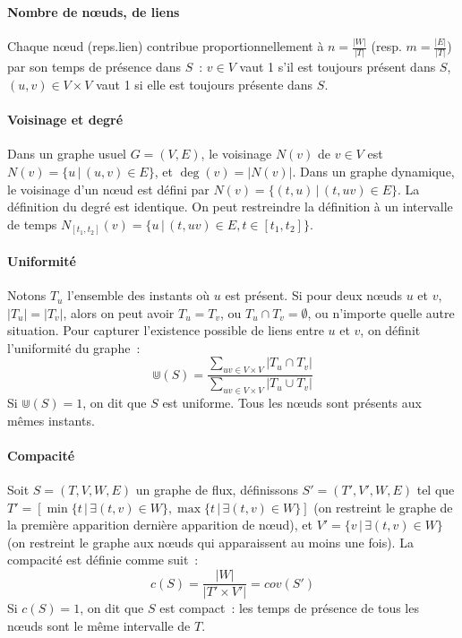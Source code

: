 \documentclass[12pt,a4paper]{article}
\begin{document}
\paragraph{Nombre de nœuds, de liens} Chaque nœud (reps.\@ lien)
contribue proportionnellement à \(n = \frac{|W|}{|T|}\) (resp.\@
\(m = \frac{|E|}{|T|}\)) par son temps de présence dans \(S\)~:
\(v \in V\) vaut 1 s'il est toujours présent dans \(S\),
\((u, v) \in V \times V\) vaut 1 si elle est toujours présente dans
\(S\).

\paragraph{Voisinage et degré} Dans un graphe usuel \(G = (V, E)\), le
voisinage \(N(v)\) de \(v \in V\) est
\(N(v) = \{u \,|\, (u, v) \in E\}\), et \(\deg(v) = |N(v)|\). Dans un
graphe dynamique, le voisinage d'un nœud est défini par
\(N(v) = \{(t, u) \,|\, (t, uv) \in E\}\). La définition du degré est
identique. On peut restreindre la définition à un intervalle de temps
\(N_{[t_1, t_2]}(v) = \{u \,|\, (t, uv) \in E, t \in [t_1, t_2]\}\).\\

\paragraph{Uniformité} Notons \(T_u\) l'ensemble des instants où \(u\)
est présent. Si pour deux nœuds \(u\) et \(v\), \(|T_u| = |T_v|\),
alors on peut avoir \(T_u = T_v\), ou \(T_u \cap T_v = \emptyset\), ou
n'importe quelle autre situation. Pour capturer l'existence possible
de liens entre \(u\) et \(v\), on définit l'uniformité du graphe~:
\[\Cup(S) = \frac{\sum_{uv \in V \times V}|T_u \cap T_v|}{\sum_{uv \in
      V \times V}|T_u \cup T_v|}\]
Si \(\Cup(S) = 1\), on dit que \(S\) est uniforme. Tous les nœuds sont
présents aux mêmes instants.

\paragraph{Compacité} Soit \(S = (T, V, W, E)\) un graphe de flux,
définissons \(S' = (T', V', W, E)\) tel que
\(T' = [\min\{t \,|\, \exists (t, v) \in W\}, \max\{t \,|\, \exists
(t, v) \in W\}]\) (on restreint le graphe de la première apparition
dernière apparition de nœud), et
\(V' = \{v \,|\, \exists (t, v) \in W\}\) (on restreint le graphe aux
nœuds qui apparaissent au moins une fois). La compacité est définie
comme suit~:
\[c(S) = \frac{|W|}{|T' \times V'|} = cov(S')\]
Si \(c(S) = 1\), on dit que \(S\) est compact~: les temps de présence
de tous les nœuds sont le même intervalle de \(T\).\\
\end{document}
